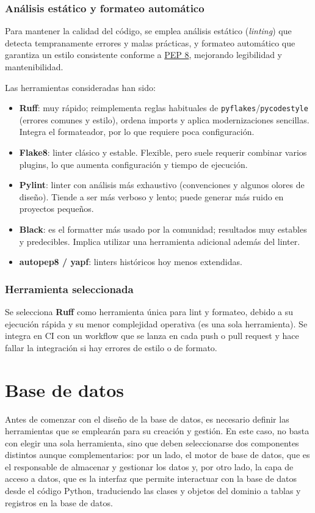 \subsubsection{Análisis estático y formateo automático}
Para mantener la calidad del código, se emplea análisis estático (\emph{linting}) que detecta tempranamente 
errores y malas prácticas, y formateo automático que garantiza un estilo consistente conforme a 
\href{https://peps.python.org/pep-0008/}{PEP 8}, mejorando legibilidad y mantenibilidad.

Las herramientas consideradas han sido:

\begin{itemize}
  \item \textbf{Ruff}: muy rápido; reimplementa reglas habituales de \texttt{pyflakes}/\texttt{pycodestyle}
  (errores comunes y estilo), ordena imports y aplica modernizaciones sencillas. Integra el formateador, por
  lo que requiere poca configuración.
  \item \textbf{Flake8}: linter clásico y estable. Flexible, pero suele requerir combinar
  varios plugins, lo que aumenta configuración y tiempo de ejecución.
  \item \textbf{Pylint}: linter con análisis más exhaustivo (convenciones y algunos olores de diseño). Tiende
  a ser más verboso y lento; puede generar más ruido en proyectos pequeños.
  \item \textbf{Black}: es el formatter más usado por la comunidad; resultados muy estables y predecibles. Implica
  utilizar una herramienta adicional además del linter.
  \item \textbf{autopep8 / yapf}: linters históricos hoy menos extendidas.
\end{itemize}

\subsubsection{Herramienta seleccionada}
Se selecciona \textbf{Ruff} como herramienta única para lint y formateo, debido a su ejecución rápida y su menor 
complejidad operativa (es una sola herramienta).
Se integra en CI con un workflow que se lanza en cada push o pull request y hace fallar la integración si hay 
errores de estilo o de formato.

\section{Base de datos}\label{sec:base-datos}
Antes de comenzar con el diseño de la base de datos, es necesario definir las herramientas que se emplearán para 
su creación y gestión. En este caso, no basta con elegir una sola herramienta, sino que deben seleccionarse dos 
componentes distintos aunque complementarios: por un lado, el motor de base de datos, que es el responsable de 
almacenar y gestionar los datos y, por otro lado, la capa de acceso a datos, que es la interfaz que permite 
interactuar con la base de datos desde el código Python, traduciendo las clases y objetos del dominio a tablas y
registros en la base de datos.

